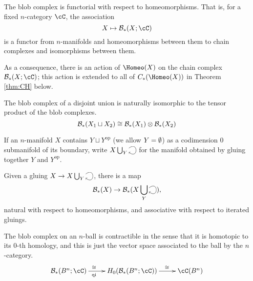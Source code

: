 \documentclass{pnastwo}
\begin{document}
\begin{article}
\begin{property}[Functoriality]
\label{property:functoriality}%
The blob complex is functorial with respect to homeomorphisms.
That is, 
for a fixed $n$-category $\cC$, the association
\begin{equation*}
X \mapsto \bc_*(X; \cC)
\end{equation*}
is a functor from $n$-manifolds and homeomorphisms between them to chain 
complexes and isomorphisms between them.
\end{property}
As a consequence, there is an action of $\Homeo(X)$ on the chain complex $\bc_*(X; \cC)$; 
this action is extended to all of $C_*(\Homeo(X))$ in Theorem \ref{thm:CH} below.

\begin{property}
\label{property:disjoint-union}
The blob complex of a disjoint union is naturally isomorphic to the tensor product of the blob complexes.
\begin{equation*}
{\mathcal B}_*(X_1 \sqcup X_2) \cong {\mathcal B}_*(X_1) \otimes {\mathcal B}_*(X_2)
\end{equation*}
\end{property}

If an $n$-manifold $X$ contains $Y \sqcup Y^\text{op}$ (we allow $Y = \emptyset$) as a codimension $0$ submanifold of its boundary, 
write $X \bigcup_{Y}\selfarrow$ for the manifold obtained by gluing together $Y$ and $Y^\text{op}$.
\begin{property}
\label{property:gluing-map}%
Given a gluing $X \to X \bigcup_{Y}\selfarrow$, there is
a map
\[
	\bc_*(X) \to \bc_*(X \bigcup_{Y}\selfarrow),
\]
natural with respect to homeomorphisms, and associative with respect to iterated gluings.
\end{property}

\begin{property}[Contractibility]
\label{property:contractibility}%
The blob complex on an $n$-ball is contractible in the sense 
that it is homotopic to its $0$-th homology, and this is just the vector space associated to the ball by the $n$-category.
\begin{equation*}
\xymatrix{\bc_*(B^n;\cC) \ar[r]^(0.4){\iso}_(0.4){\text{qi}} & H_0(\bc_*(B^n;\cC)) \ar[r]^(0.6)\iso & \cC(B^n)}
\end{equation*}
\end{property}


\end{article}
\end{document}
